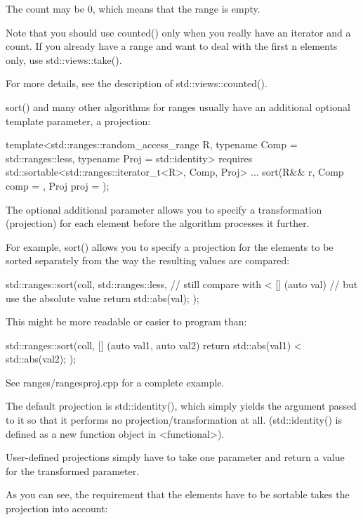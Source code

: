 The count may be 0, which means that the range is empty.

Note that you should use counted() only when you really have an iterator and a count. If you already have a range and want to deal with the first n elements only, use std::views::take().

For more details, see the description of std::views::counted().


sort() and many other algorithms for ranges usually have an additional optional template parameter, a projection:

\begin{cpp}
template<std::ranges::random_access_range R,
			typename Comp = std::ranges::less,
			typename Proj = std::identity>
requires std::sortable<std::ranges::iterator_t<R>, Comp, Proj>
... sort(R&& r, Comp comp = {}, Proj proj = {});
\end{cpp}

The optional additional parameter allows you to specify a transformation (projection) for each element before the algorithm processes it further.

For example, sort() allows you to specify a projection for the elements to be sorted separately from the way the resulting values are compared:

\begin{cpp}
std::ranges::sort(coll,
				std::ranges::less{}, // still compare with <
				[] (auto val) { // but use the absolute value
					return std::abs(val);
				});
\end{cpp}

This might be more readable or easier to program than:

\begin{cpp}
std::ranges::sort(coll,
				[] (auto val1, auto val2) {
					return std::abs(val1) < std::abs(val2);
				});
\end{cpp}

See ranges/rangesproj.cpp for a complete example.

The default projection is std::identity(), which simply yields the argument passed to it so that it performs no projection/transformation at all. (std::identity() is defined as a new function object in <functional>).

User-defined projections simply have to take one parameter and return a value for the transformed parameter.

As you can see, the requirement that the elements have to be sortable takes the projection into account:

